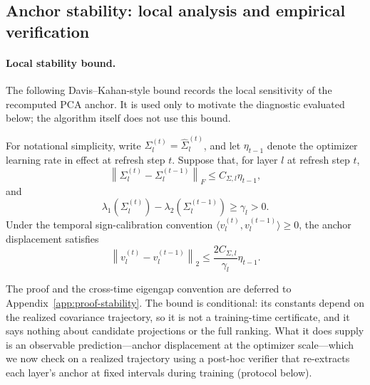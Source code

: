 \subsection{Anchor stability: local analysis and empirical
verification}
\label{sec:local-anchor-stability}

\paragraph{Local stability bound.}
The following Davis--Kahan-style bound records the local sensitivity
of the recomputed PCA anchor. It is used only to motivate the
diagnostic evaluated below; the algorithm itself does not use this
bound.

\begin{theorem}
\label{thm:anchor-stability}
For notational simplicity, write
\(\Sigma_l^{(t)}=\widehat{\Sigma}_l^{(t)}\), and let \(\eta_{t-1}\)
denote the optimizer learning rate in effect at refresh step \(t\).
Suppose that, for layer \(l\) at refresh step \(t\),
\begin{equation}
  \left\|
  \Sigma_l^{(t)}-\Sigma_l^{(t-1)}
  \right\|_F
  \le
  C_{\Sigma,l}\eta_{t-1},
  \label{eq:cov-drift-assumption}
\end{equation}
and
\begin{equation}
  \lambda_1(\Sigma_l^{(t)})
  -
  \lambda_2(\Sigma_l^{(t-1)})
  \ge
  \gamma_l>0 .
  \label{eq:gap-assumption}
\end{equation}
Under the temporal sign-calibration convention
\(\langle v_l^{(t)},v_l^{(t-1)}\rangle\ge 0\), the anchor displacement
satisfies
\begin{equation}
  \left\|
  v_l^{(t)}-v_l^{(t-1)}
  \right\|_2
  \le
  \frac{2C_{\Sigma,l}}{\gamma_l}\eta_{t-1}.
  \label{eq:anchor-stability-bound}
\end{equation}
\end{theorem}

The proof and the cross-time eigengap convention are deferred to
Appendix~\ref{app:proof-stability}. The bound is conditional: its
constants depend on the realized covariance trajectory, so it is not
a training-time certificate, and it says nothing about candidate
projections or the full ranking. What it does supply is an
observable prediction---anchor displacement at the optimizer
scale---which we now check on a realized trajectory using a
post-hoc verifier that re-extracts each layer's anchor at fixed
intervals during training (protocol below).

